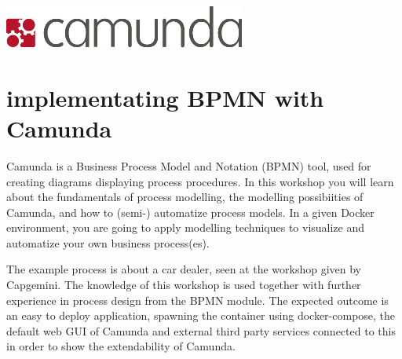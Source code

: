 \hfill\includegraphics[width=.5\linewidth]{images/camunda_logo.png}
\section*{implementating BPMN with Camunda}

Camunda is a Business Process Model and Notation (BPMN) tool, used for creating diagrams displaying process procedures. In this workshop you will learn about the fundamentals of process modelling, the modelling possibiities of Camunda, and how to (semi-) automatize process models. In a given Docker environment, you are going to apply modelling techniques to visualize and automatize your own business process(es).

The example process is about a car dealer, seen at the workshop given by Capgemini. The knowledge of this workshop is used together with further experience in process design from the BPMN module.  The expected outcome is an easy to deploy application, spawning the container using docker-compose, the default web GUI of Camunda and external third party services connected to this in order to show the extendability of Camunda.